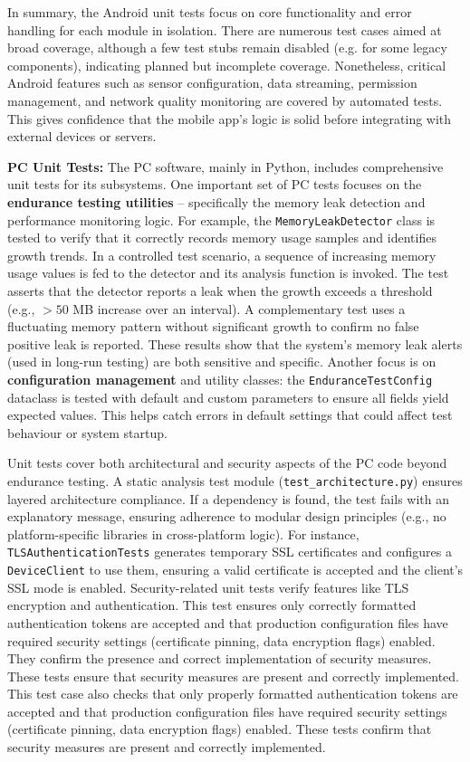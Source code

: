 In summary, the Android unit tests focus on core functionality and error handling for each module in isolation. There are numerous test cases aimed at broad coverage, although a few test stubs remain disabled (e.g. for some legacy components), indicating planned but incomplete coverage. Nonetheless, critical Android features such as sensor configuration, data streaming, permission management, and network quality monitoring are covered by automated tests. This gives confidence that the mobile app's logic is solid before integrating with external devices or servers.

\textbf{PC Unit Tests:} The PC software, mainly in Python, includes comprehensive unit tests for its subsystems. One important set of PC tests focuses on the \textbf{endurance testing utilities} -- specifically the memory leak detection and performance monitoring logic. For example, the \texttt{MemoryLeakDetector} class is tested to verify that it correctly records memory usage samples and identifies growth trends. In a controlled test scenario, a sequence of increasing memory usage values is fed to the detector and its analysis function is invoked. The test asserts that the detector reports a leak when the growth exceeds a threshold (e.g., $>50$ MB increase over an interval). A complementary test uses a fluctuating memory pattern without significant growth to confirm no false positive leak is reported. These results show that the system's memory leak alerts (used in long-run testing) are both sensitive and specific. Another focus is on \textbf{configuration management} and utility classes: the \texttt{EnduranceTestConfig} dataclass is tested with default and custom parameters to ensure all fields yield expected values. This helps catch errors in default settings that could affect test behaviour or system startup.

Unit tests cover both architectural and security aspects of the PC code beyond endurance testing. A static analysis test module (\texttt{test\_architecture.py}) ensures layered architecture compliance. If a dependency is found, the test fails with an explanatory message, ensuring adherence to modular design principles (e.g., no platform-specific libraries in cross-platform logic). For instance, \texttt{TLSAuthenticationTests} generates temporary SSL certificates and configures a \texttt{DeviceClient} to use them, ensuring a valid certificate is accepted and the client's SSL mode is enabled. Security-related unit tests verify features like TLS encryption and authentication. This test ensures only correctly formatted authentication tokens are accepted and that production configuration files have required security settings (certificate pinning, data encryption flags) enabled. They confirm the presence and correct implementation of security measures. These tests ensure that security measures are present and correctly implemented. This test case also checks that only properly formatted authentication tokens are accepted and that production configuration files have required security settings (certificate pinning, data encryption flags) enabled. These tests confirm that security measures are present and correctly implemented.

